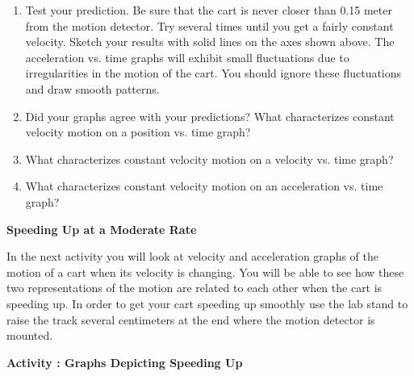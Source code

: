 \begin{enumerate}
\item Test your prediction. Be sure that the cart is never closer than 0.15 meter
from the motion detector. Try several times until you get a fairly constant
velocity. Sketch your results with solid lines on the axes shown above. The
acceleration vs. time graphs will exhibit small fluctuations due to irregularities
in the motion of the cart. You should ignore these fluctuations and draw smooth
patterns.

\item Did your graphs agree with your predictions? What characterizes constant
velocity motion on a position vs. time graph? 
\vspace{10mm}

\item What characterizes constant velocity motion on a velocity vs. time graph?
\vspace{10mm}

\item What characterizes constant velocity motion on an acceleration vs. time graph?
\vspace{10mm}

\end{enumerate}

\textbf{Speeding Up at a Moderate Rate} 

In the next activity you will look at velocity and acceleration graphs of the
motion of a cart when its velocity is changing. You will be able to see how
these two representations of the motion are related to each other when the cart
is speeding up.
In order to get your cart speeding up smoothly use the lab stand to raise the
track several centimeters at the end where the motion detector is mounted.

\textbf{Activity : Graphs Depicting Speeding Up}

